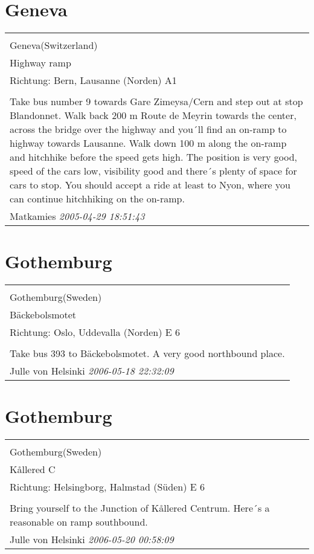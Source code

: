 \documentclass[a4paper,12pt]{article}
\begin{document}
\section{Geneva}
\begin{tabular}{|p{13cm}|}
\hline\\
Geneva(Switzerland)\\
Highway ramp\\
Richtung: Bern, Lausanne (Norden) A1 \\
\hline\\
Take bus number 9 towards Gare Zimeysa/Cern and step out at stop Blandonnet. Walk back 200 m Route de Meyrin towards the center, across the bridge over the highway and you´ll find an on-ramp to highway towards Lausanne. Walk down 100 m along the on-ramp and hitchhike before the speed gets high. The position is very good, speed of the cars low, visibility good and there´s plenty of space for cars to stop. You should accept a ride at least to Nyon, where you can continue hitchhiking on the on-ramp. \\
Matkamies \textit{ 2005-04-29 18:51:43 }\\\hline
\end{tabular}


\section{Gothemburg}
\begin{tabular}{|p{13cm}|}
\hline\\
Gothemburg(Sweden)\\
Bäckebolsmotet\\
Richtung: Oslo, Uddevalla (Norden) E 6 \\
\hline\\
Take bus 393 to Bäckebolsmotet. A very good northbound place. \\
Julle von Helsinki \textit{ 2006-05-18 22:32:09 }\\\hline
\end{tabular}


\section{Gothemburg}
\begin{tabular}{|p{13cm}|}
\hline\\
Gothemburg(Sweden)\\
Kållered C\\
Richtung: Helsingborg, Halmstad (Süden) E 6 \\
\hline\\
Bring yourself to the Junction of Kållered Centrum. Here´s a reasonable on ramp southbound. \\
Julle von Helsinki \textit{ 2006-05-20 00:58:09 }\\\hline
\end{tabular}
\end{document}
